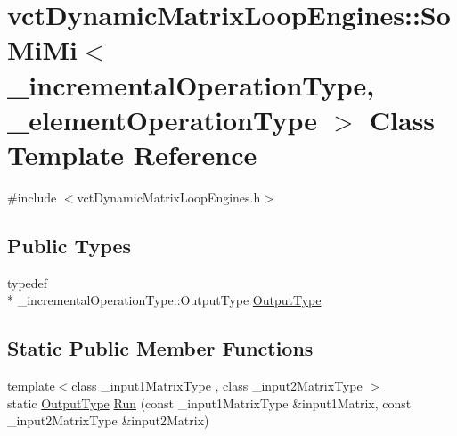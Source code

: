 \hypertarget{classvct_dynamic_matrix_loop_engines_1_1_so_mi_mi}{\section{vct\-Dynamic\-Matrix\-Loop\-Engines\-:\-:So\-Mi\-Mi$<$ \-\_\-incremental\-Operation\-Type, \-\_\-element\-Operation\-Type $>$ Class Template Reference}
\label{classvct_dynamic_matrix_loop_engines_1_1_so_mi_mi}
}


{\ttfamily \#include $<$vct\-Dynamic\-Matrix\-Loop\-Engines.\-h$>$}

\subsection*{Public Types}
\begin{DoxyCompactItemize}
\item 
typedef \\*
\-\_\-incremental\-Operation\-Type\-::\-Output\-Type \hyperlink{classvct_dynamic_matrix_loop_engines_1_1_so_mi_mi_afc313c791e57a98048279521a3f18e78}{Output\-Type}
\end{DoxyCompactItemize}
\subsection*{Static Public Member Functions}
\begin{DoxyCompactItemize}
\item 
{\footnotesize template$<$class \-\_\-input1\-Matrix\-Type , class \-\_\-input2\-Matrix\-Type $>$ }\\static \hyperlink{classvct_dynamic_matrix_loop_engines_1_1_so_mi_mi_afc313c791e57a98048279521a3f18e78}{Output\-Type} \hyperlink{classvct_dynamic_matrix_loop_engines_1_1_so_mi_mi_a6cfefacd9d5f0ca541d3eb57d9538e72}{Run} (const \-\_\-input1\-Matrix\-Type \&input1\-Matrix, const \-\_\-input2\-Matrix\-Type \&input2\-Matrix)
\end{DoxyCompactItemize}


